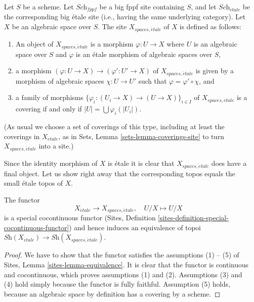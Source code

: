 \begin{definition}
\label{definition-spaces-etale-site}
Let $S$ be a scheme.
Let $\textit{Sch}_{fppf}$ be a big fppf site containing $S$,
and let $\textit{Sch}_{\acute{e}tale}$ be the corresponding big \'etale site
(i.e., having the same underlying category).
Let $X$ be an algebraic space over $S$.
The site {\it $X_{spaces, \acute{e}tale}$} of $X$ is defined as follows:
\begin{enumerate}
\item An object of $X_{spaces, \acute{e}tale}$ is a morphism
$\varphi : U \to X$ where $U$ is an algebraic space over $S$ and
$\varphi$ is an \'etale morphism of algebraic spaces over $S$,
\item a morphism $(\varphi : U \to X) \to (\varphi' : U' \to X)$ of
$X_{spaces, \acute{e}tale}$ is given by a morphism of algebraic spaces
$\chi : U \to U'$ such that $\varphi = \varphi' \circ \chi$, and
\item a family of morphisms
$\{\varphi_i : (U_i \to X) \to (U \to X)\}_{i \in I}$
of $X_{spaces, \acute{e}tale}$ is a covering if and only if
$|U| = \bigcup \varphi_i(|U_i|)$.
\end{enumerate}
(As usual we choose a set of coverings of this type, including at least
the coverings in $X_{\acute{e}tale}$, as in
Sets, Lemma \ref{sets-lemma-coverings-site}
to turn $X_{spaces, \acute{e}tale}$ into a site.)
\end{definition}

\noindent
Since the identity morphism of $X$ is \'etale it is clear that
$X_{spaces, \acute{e}tale}$ does have a final object.
Let us show right away that the corresponding topos equals the
small \'etale topos of $X$.

\begin{lemma}
\label{lemma-compare-etale-sites}
The functor
$$
X_{\acute{e}tale} \longrightarrow X_{spaces, \acute{e}tale}, \quad
U/X \longmapsto U/X
$$
is a special cocontinuous functor
(Sites, Definition \ref{sites-definition-special-cocontinuous-functor})
and hence induces an equivalence of topoi
$\textit{Sh}(X_{\acute{e}tale}) \to \textit{Sh}(X_{spaces, \acute{e}tale})$.
\end{lemma}

\begin{proof}
We have to show that the functor satisfies the assumptions (1) -- (5) of
Sites, Lemma \ref{sites-lemma-equivalence}.
It is clear that the functor is continuous and cocontinuous, which
proves assumptions (1) and (2).
Assumptions (3) and (4) hold simply because the functor is fully faithful.
Assumption (5) holds, because an algebraic space by definition has
a covering by a scheme.
\end{proof}

